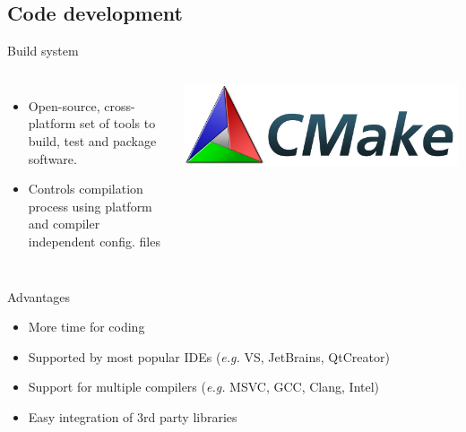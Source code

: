 \documentclass{beamer}
\begin{document}


\subsection{Code development}
\begin{frame}{Build system}
	\begin{columns}[onlytextwidth]
		\begin{itemize}
			\item Open-source, cross-platform set of tools to build, test and package software.
			\item Controls compilation process using platform and compiler independent config. files
		\end{itemize}
		\includegraphics[keepaspectratio=true, width=1\linewidth]{figures/cmake.png}
	\end{columns}
	\vspace{1\baselineskip}
	\begin{quote}
		\centering
	\end{quote}
	\begin{exampleblock}{Advantages}
		\begin{itemize}
			\item More time for coding
			\item Supported by most popular IDEs (\textit{e.g.} VS, JetBrains, QtCreator)
			\item Support for multiple compilers (\textit{e.g.} MSVC, GCC, Clang, Intel)
			\item Easy integration of 3rd party libraries
		\end{itemize}
	\end{exampleblock}	  
\end{frame}
\end{document}
